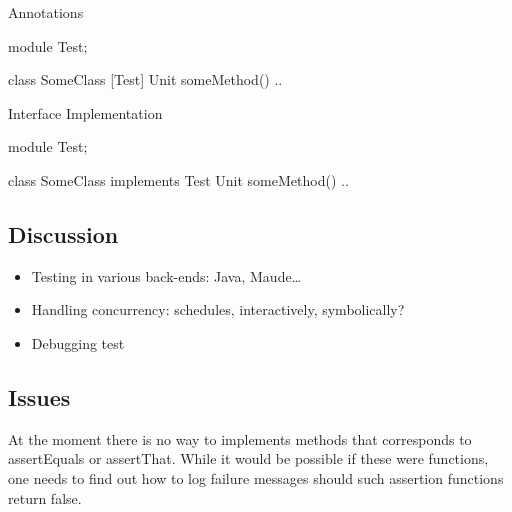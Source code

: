 \documentclass[a4paper,11pt,final]{article}
\begin{document}
\noindent Annotations
\begin{absexamplen}
module Test;

class SomeClass { 
  [Test] Unit someMethod() {
  	 ..
  }
}
\end{absexamplen}

\noindent Interface Implementation
\begin{absexamplen}
module Test;

class SomeClass implements Test { 
  Unit someMethod() {
  	 ..
  }
}
\end{absexamplen}

\subsection{Discussion}
\begin{itemize}
  \item Testing in various back-ends: Java, Maude\ldots
  \item Handling concurrency: schedules, interactively, symbolically?
  \item Debugging test
\end{itemize}

\subsection{Issues}
At the moment there is no way to implements methods that corresponds to
assertEquals or assertThat. While it would be possible if these were functions,
one needs to find out how to log failure messages should such assertion
functions return false.
\end{document}
